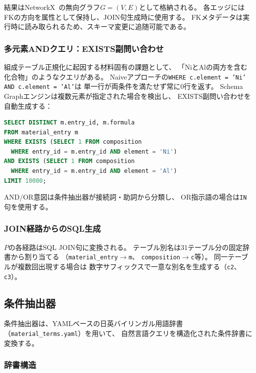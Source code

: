 \documentclass[5p,twocolumn]{elsarticle}
\begin{document}
結果はNetworkX~\cite{networkx2008}の無向グラフ$G = (V, E)$として格納される。
各エッジにはFKの方向を属性として保持し、JOIN句生成時に使用する。
FKメタデータは実行時に読み取られるため、スキーマ変更に追随可能である。

\subsubsection{多元素ANDクエリ：EXISTS副問い合わせ}
\label{sec:multi_element}

組成テーブル正規化に起因する材料固有の課題として、
「NiとAlの両方を含む化合物」のようなクエリがある。
Naiveアプローチの\texttt{WHERE c.element = 'Ni' AND c.element = 'Al'}は
単一行が両条件を満たせず常に0行を返す。
Schema Graphエンジンは複数元素が指定された場合を検出し、
EXISTS副問い合わせを自動生成する：

\begin{lstlisting}[language=SQL,caption={多元素AND},label=lst:exists,numbers=none]
SELECT DISTINCT m.entry_id, m.formula
FROM material_entry m
WHERE EXISTS (SELECT 1 FROM composition
  WHERE entry_id = m.entry_id AND element = 'Ni')
AND EXISTS (SELECT 1 FROM composition
  WHERE entry_id = m.entry_id AND element = 'Al')
LIMIT 10000;
\end{lstlisting}

AND/OR意図は条件抽出器が接続詞・助詞から分類し、
OR指示語の場合は\texttt{IN}句を使用する。

\subsubsection{JOIN経路からのSQL生成}

$P$の各経路はSQL JOIN句に変換される。
テーブル別名は31テーブル分の固定辞書から割り当てる
（\texttt{material\_entry}$\to$\texttt{m}、
\texttt{composition}$\to$\texttt{c}等）。
同一テーブルが複数回出現する場合は
数字サフィックスで一意な別名を生成する（\texttt{c2}、\texttt{c3}）。

\subsection{条件抽出器}
\label{sec:entity_extractor}

条件抽出器は、YAMLベースの日英バイリンガル用語辞書
（\texttt{material\_terms.yaml}）を用いて、
自然言語クエリを構造化された条件辞書に変換する。

\subsubsection{辞書構造}
\end{document}
